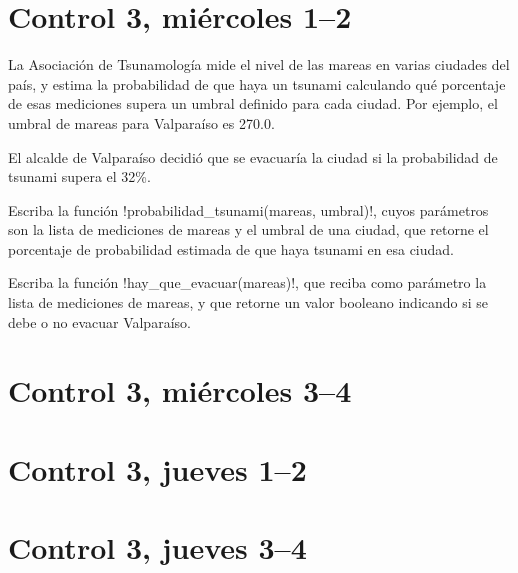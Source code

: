 \documentclass[12pt,spanish,a5paper,landscape]{article}
\begin{document}
  \pagestyle{empty}
  \thispagestyle{empty}

  \part*{Control 3, miércoles 1--2}
  \newpage
  La Asociación de Tsunamología mide el nivel de las mareas
  en varias ciudades del país,
  y estima la probabilidad de que haya un tsunami
  calculando qué porcentaje de esas mediciones
  supera un umbral definido para cada ciudad.
  Por ejemplo,
  el umbral de mareas para Valparaíso es 270.0.

  El alcalde de Valparaíso decidió que se evacuaría la ciudad
  si la probabilidad de tsunami supera el 32\%.

  Escriba la función \li!probabilidad_tsunami(mareas, umbral)!,
  cuyos parámetros son la lista de mediciones de mareas
  y el umbral de una ciudad,
  que retorne el porcentaje de probabilidad estimada
  de que haya tsunami en esa ciudad.

  Escriba la función \li!hay_que_evacuar(mareas)!,
  que reciba como parámetro la lista de mediciones de mareas,
  y que retorne un valor booleano
  indicando si se debe o no evacuar Valparaíso.
  


  \newpage
  \part*{Control 3, miércoles 3--4}
  \newpage

  \newpage
  \part*{Control 3, jueves 1--2}
  \newpage

  \newpage
  \part*{Control 3, jueves 3--4}
  \newpage
\end{document}

